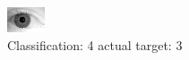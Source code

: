 \begin{figure}[h!]
\begin{center}
\includegraphics[width=0.60\columnwidth]{figures/ID2168_class_4_target_3.png}
\end{center}
\caption{ Classification: 4 actual target: 3}
\label{fig:ID2168_class_4_target_3}
\end{figure}
